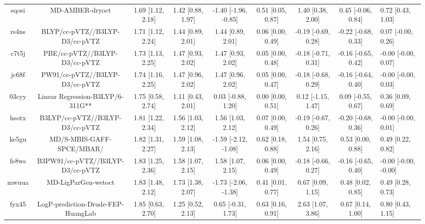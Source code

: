 \documentclass{article}
\begin{document}
\begin{center}
\begin{longtable}{|cccccccc|}
 sqosi &                                    MD-AMBER-dryoct &  1.69 [1.12, 2.18] &  1.42 [0.88, 1.97] &  -1.40 [-1.96, -0.85] &  0.51 [0.05, 0.87] &    1.40 [0.38, 2.00] &   0.45 [-0.06, 0.84] &     0.72 [0.43, 1.03] \\
 rs4ns &                     BLYP/cc-pVTZ//B3LYP-D3/cc-pVTZ &  1.71 [1.12, 2.24] &  1.44 [0.89, 2.01] &     1.44 [0.89, 2.01] &  0.06 [0.00, 0.49] &  -0.19 [-0.69, 0.28] &  -0.22 [-0.68, 0.33] &    0.07 [-0.00, 0.26] \\
 c7t5j &                      PBE/cc-pVTZ//B3LYP-D3/cc-pVTZ &  1.73 [1.13, 2.25] &  1.47 [0.93, 2.02] &     1.47 [0.93, 2.02] &  0.05 [0.00, 0.48] &  -0.18 [-0.71, 0.31] &  -0.16 [-0.65, 0.42] &   -0.00 [-0.00, 0.07] \\
 jc68f &                     PW91/cc-pVTZ//B3LYP-D3/cc-pVTZ &  1.74 [1.16, 2.25] &  1.47 [0.96, 2.02] &     1.47 [0.96, 2.02] &  0.05 [0.00, 0.47] &  -0.18 [-0.68, 0.29] &  -0.16 [-0.64, 0.40] &   -0.00 [-0.00, 0.03] \\
 03cyy &                   Linear Regression-B3LYP/6-311G** &  1.75 [0.58, 2.74] &  1.11 [0.43, 2.01] &    0.03 [-0.88, 1.20] &  0.00 [0.00, 0.51] &   0.12 [-1.15, 1.47] &   0.09 [-0.55, 0.67] &     0.36 [0.09, 0.69] \\
 hsotx &                    B3LYP/cc-pVTZ//B3LYP-D3/cc-pVTZ &  1.81 [1.22, 2.34] &  1.56 [1.03, 2.12] &     1.56 [1.03, 2.12] &  0.07 [0.00, 0.49] &  -0.19 [-0.67, 0.26] &  -0.20 [-0.68, 0.36] &   -0.00 [-0.00, 0.01] \\
 ke5gu &                          MD/S-MBIS-GAFF-SPCE/MBAR/ &  1.82 [1.31, 2.27] &  1.59 [1.08, 2.13] &  -1.59 [-2.12, -1.08] &  0.62 [0.18, 0.88] &    1.54 [0.75, 2.16] &    0.53 [0.00, 0.88] &     0.49 [0.22, 0.82] \\
 fe8ws &                   B3PW91/cc-pVTZ//B3LYP-D3/cc-pVTZ &  1.83 [1.25, 2.36] &  1.58 [1.07, 2.15] &     1.58 [1.07, 2.15] &  0.06 [0.00, 0.49] &  -0.18 [-0.66, 0.27] &  -0.16 [-0.65, 0.40] &  -0.00 [-0.00, -0.00] \\
 mwuua &                                MD-LigParGen-wetoct &  1.83 [1.48, 2.12] &  1.73 [1.38, 2.07] &  -1.73 [-2.06, -1.38] &  0.41 [0.01, 0.77] &    0.67 [0.09, 1.15] &    0.48 [0.02, 0.85] &     0.49 [0.28, 0.73] \\
 fyx45 &                 LogP-prediction-Drude-FEP-HuangLab &  1.85 [0.63, 2.70] &  1.25 [0.52, 2.13] &    0.65 [-0.31, 1.73] &  0.63 [0.16, 0.91] &    2.63 [1.07, 3.86] &    0.67 [0.14, 1.00] &     0.80 [0.43, 1.15] \\

\end{longtable}
\end{center}
\end{document}
